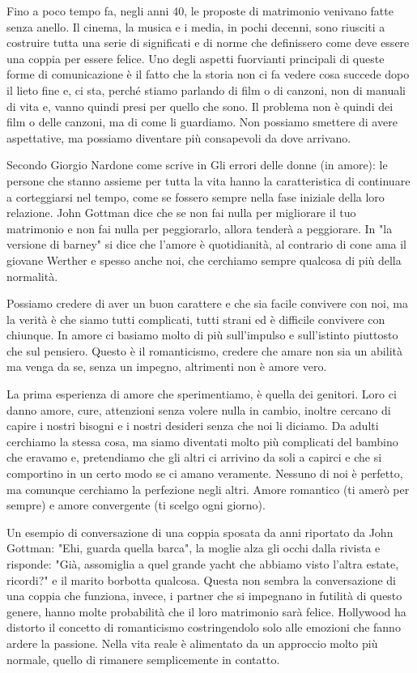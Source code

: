 \documentclass[12pt]{book} %
\begin{document}
Fino a poco tempo fa, negli anni 40, le proposte di matrimonio venivano fatte senza anello. Il
cinema, la musica e i media, in pochi decenni, sono riusciti a costruire tutta una serie di significati e di norme che
definissero come deve essere una coppia per essere felice. Uno degli aspetti fuorvianti principali di queste forme di
comunicazione è il fatto che la storia non ci fa vedere cosa succede dopo il lieto fine e, ci sta, perché stiamo
parlando di film o di canzoni, non di manuali di vita e, vanno quindi presi per quello che sono. Il problema non è
quindi dei film o delle canzoni, ma di come li guardiamo. Non possiamo smettere di avere aspettative, ma possiamo
diventare più consapevoli da dove arrivano.

Secondo Giorgio Nardone come scrive in Gli errori delle donne (in amore): le persone
che stanno assieme per tutta la vita hanno la caratteristica di continuare a corteggiarsi nel tempo, come se fossero
sempre nella fase iniziale della loro relazione. John Gottman dice che se non fai nulla per migliorare il tuo
matrimonio e non fai nulla per peggiorarlo, allora tenderà a peggiorare.
In "la versione di barney" si dice che l'amore è quotidianità, al contrario di cone ama il giovane Werther e spesso anche noi, che cerchiamo sempre qualcosa di più della normalità.

Possiamo credere di aver un buon carattere e che sia facile convivere con noi, ma la verità è che siamo tutti
complicati, tutti strani ed è difficile convivere con chiunque. In amore ci basiamo molto di più sull'impulso e
sull'istinto piuttosto che sul pensiero. Questo è il romanticismo, credere che amare non sia un abilità ma venga da se,
senza un impegno, altrimenti non è amore vero.

La prima esperienza di amore che sperimentiamo, è quella dei genitori. Loro ci danno amore, cure, attenzioni senza
volere nulla in cambio, inoltre cercano di capire i nostri bisogni e i nostri desideri senza che noi li diciamo. Da
adulti cerchiamo la stessa cosa, ma siamo diventati molto più complicati del bambino che eravamo e, pretendiamo che
gli altri ci arrivino da soli a capirci e che si comportino in un certo modo se ci amano veramente. Nessuno di noi è
perfetto, ma comunque cerchiamo la perfezione negli altri. Amore romantico (ti amerò per sempre) e amore convergente (ti scelgo ogni giorno).

Un esempio di conversazione di una coppia sposata da anni riportato da John Gottman: "Ehi, guarda
quella barca", la moglie alza gli occhi dalla rivista e risponde: "Già,
assomiglia a quel grande yacht che abbiamo visto l'altra estate, ricordi?" e
il marito borbotta qualcosa. Questa non sembra la conversazione di una coppia che funziona, invece, i partner che si
impegnano in futilità di questo genere, hanno molte probabilità che il loro matrimonio sarà felice.
Hollywood ha distorto il concetto di romanticismo costringendolo solo alle emozioni che fanno ardere la passione. Nella
vita reale è alimentato da un approccio molto più normale, quello di rimanere semplicemente in contatto. 
\end{document}
